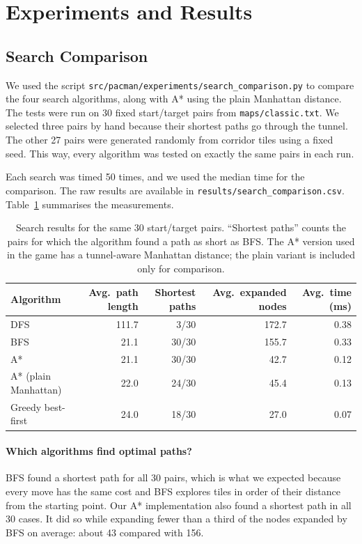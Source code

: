 \documentclass[12pt,a4paper]{article}
\begin{document}
\section{Experiments and Results}
\label{sec:results}

\subsection{Search Comparison}
\label{sec:search-results}

We used the script \texttt{src/pacman/experiments/search\_comparison.py} to compare the four search algorithms, along with A* using the plain Manhattan distance. The tests were run on 30 fixed start/target pairs from \texttt{maps/classic.txt}. We selected three pairs by hand because their shortest paths go through the tunnel. The other 27 pairs were generated randomly from corridor tiles using a fixed seed. This way, every algorithm was tested on exactly the same pairs in each run.

Each search was timed 50 times, and we used the median time for the comparison. The raw results are available in \texttt{results/search\_comparison.csv}. Table~\ref{tab:search} summarises the measurements.

\begin{table}[H]
  \centering
  \caption{Search results for the same 30 start/target pairs. \enquote{Shortest paths} counts the pairs for which the algorithm found a path as short as BFS. The A* version used in the game has a tunnel-aware Manhattan distance; the plain variant is included only for comparison.}
  \label{tab:search}
  \begin{tabular}{lrrrr}
    \toprule
    Algorithm & Avg.\ path length & Shortest paths & Avg.\ expanded nodes & Avg.\ time (ms) \\
    \midrule
    DFS & 111.7 & 3/30 & 172.7 & 0.38 \\
    BFS & 21.1 & 30/30 & 155.7 & 0.33 \\
    A* & 21.1 & 30/30 & 42.7 & 0.12 \\
    A* (plain Manhattan) & 22.0 & 24/30 & 45.4 & 0.13 \\
    Greedy best-first & 24.0 & 18/30 & 27.0 & 0.07 \\
    \bottomrule
  \end{tabular}
\end{table}

\paragraph{Which algorithms find optimal paths?} BFS found a shortest path for all 30 pairs, which is what we expected because every move has the same cost and BFS explores tiles in order of their distance from the starting point. Our A* implementation also found a shortest path in all 30 cases. It did so while expanding fewer than a third of the nodes expanded by BFS on average: about 43 compared with 156.
\end{document}
